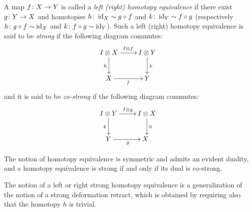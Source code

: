 \documentclass[reqno,10pt,a4paper,oneside]{amsart}
\begin{document}
\begin{definition}
\label{def:homotopy-equivalence}
A map $f \colon X \to Y$ is called a \emph{left (right) homotopy equivalence} if there exist $g \colon Y \to X$ and homotopies $h \colon \operatorname{id}_X \sim g \mathbin{\circ} f$ and $k \colon
\operatorname{id}_Y \sim f \mathbin{\circ} g$ (respectively $h \colon g \mathbin{\circ} f \sim \operatorname{id}_X$ and $k \colon f \mathbin{\circ} g \sim \operatorname{id}_Y$). Such a left (right) homotopy equivalence is said to be \emph{strong} if the
following diagram commutes:
\[
\xymatrix{
\interval \otimes X \ar[r]^{\interval \otimes f } \ar[d]_{h} & \interval \otimes Y \ar[d]^{k} \\
X \ar[r]_{f} & Y}
\]
and it is said to be \emph{co-strong} if  the following diagram commutes:
\[
\xymatrix{
\interval \otimes Y \ar[r]^{\interval \otimes g } \ar[d]_{k} & \interval \otimes X \ar[d]^{h} \\
Y \ar[r]_{g} & X \, .}
\]
%
\end{definition}

\begin{remark} The notion of homotopy equivalence is symmetric and admits an evident duality, and a homotopy equivalence is strong if 
and only if its dual is co-strong. 
\end{remark}


\begin{remark}
The notion of a left or right strong homotopy equivalence is a generalization of the notion of a strong deformation retract, which is obtained by requiring also
that the homotopy $h$ is trivial.
\end{remark} 
\end{document}
